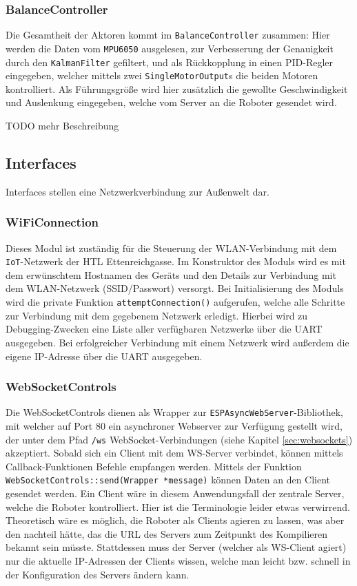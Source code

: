 \subsubsection{BalanceController}
Die Gesamtheit der Aktoren kommt im \texttt{BalanceController} zusammen:
Hier werden die Daten vom \texttt{MPU6050} ausgelesen,
zur Verbesserung der Genauigkeit durch den \texttt{KalmanFilter} gefiltert,
und als Rückkopplung in einen PID-Regler eingegeben,
welcher mittels zwei \texttt{SingleMotorOutput}s die beiden Motoren kontrolliert.
%
Als Führungsgröße wird hier zusätzlich die gewollte Geschwindigkeit und Auslenkung eingegeben,
welche vom Server an die Roboter gesendet wird.

TODO mehr Beschreibung 

\subsection{Interfaces}
Interfaces stellen eine Netzwerkverbindung zur Außenwelt dar.
%
\subsubsection{WiFiConnection}
Dieses Modul ist zuständig für die Steuerung der WLAN-Verbindung
mit dem \texttt{IoT}-Netzwerk der HTL Ettenreichgasse.
%
Im Konstruktor des Moduls wird es mit dem erwünschtem Hostnamen des Geräts
und den Details zur Verbindung mit dem WLAN-Netzwerk (SSID/Passwort) versorgt.
%
Bei Initialisierung des Moduls wird die private Funktion \texttt{attemptConnection()} aufgerufen,
welche alle Schritte zur Verbindung mit dem gegebenem Netzwerk erledigt.
%
Hierbei wird zu Debugging-Zwecken eine Liste aller verfügbaren Netzwerke über die UART ausgegeben.
%
Bei erfolgreicher Verbindung mit einem Netzwerk wird außerdem die eigene IP-Adresse über die UART ausgegeben. 

\subsubsection{WebSocketControls}
Die WebSocketControls dienen als Wrapper zur \texttt{ESPAsyncWebServer}-Bibliothek,
mit welcher auf Port 80 ein asynchroner Webserver zur Verfügung gestellt wird,
der unter dem Pfad \texttt{/ws} WebSocket-Verbindungen (siehe Kapitel \ref{sec:websockets}) akzeptiert.
%
Sobald sich ein Client mit dem WS-Server verbindet,
können mittels Callback-Funktionen Befehle empfangen werden.
%
Mittels der Funktion \texttt{WebSocketControls::send(Wrapper *message)} können Daten an den Client gesendet werden.
%
Ein Client wäre in diesem Anwendungsfall der zentrale Server, welche die Roboter kontrolliert.
%
Hier ist die Terminologie leider etwas verwirrend.
%
Theoretisch wäre es möglich,
die Roboter als Clients agieren zu lassen,
was aber den nachteil hätte,
das die URL des Servers zum Zeitpunkt des Kompilieren bekannt sein müsste.
%
Stattdessen muss der Server (welcher als WS-Client agiert) nur die aktuelle IP-Adressen der Clients wissen,
welche man leicht bzw. schnell in der Konfiguration des Servers ändern kann.

